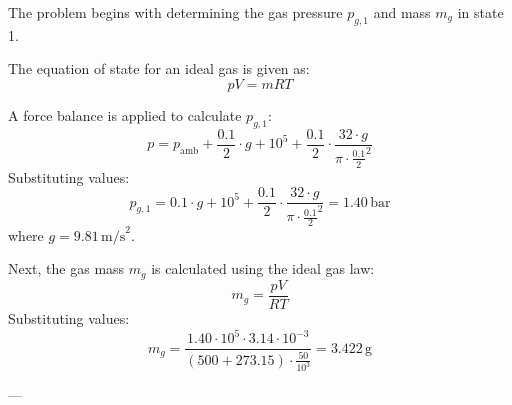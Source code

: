 The problem begins with determining the gas pressure \( p_{g,1} \) and mass \( m_g \) in state 1.  

The equation of state for an ideal gas is given as:  
\[
pV = mRT
\]  

A force balance is applied to calculate \( p_{g,1} \):  
\[
p = p_{\text{amb}} + \frac{0.1}{2} \cdot g + 10^5 + \frac{0.1}{2} \cdot \frac{32 \cdot g}{\pi \cdot \frac{0.1}{2}^2}
\]  
Substituting values:  
\[
p_{g,1} = 0.1 \cdot g + 10^5 + \frac{0.1}{2} \cdot \frac{32 \cdot g}{\pi \cdot \frac{0.1}{2}^2} = 1.40 \, \text{bar}
\]  
where \( g = 9.81 \, \text{m/s}^2 \).  

Next, the gas mass \( m_g \) is calculated using the ideal gas law:  
\[
m_g = \frac{pV}{RT}
\]  
Substituting values:  
\[
m_g = \frac{1.40 \cdot 10^5 \cdot 3.14 \cdot 10^{-3}}{(500 + 273.15) \cdot \frac{50}{10^3}} = 3.422 \, \text{g}
\]  

---